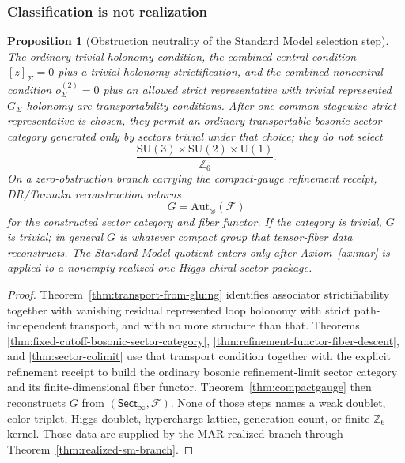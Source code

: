 \documentclass[11pt]{article}
\newtheorem{proposition}[theorem]{Proposition}
\newcommand{\SU}{\mathrm{SU}}
\newcommand{\U}{\mathrm{U}}
\begin{document}
\subsubsection{Classification is not realization}

\begin{proposition}[Obstruction neutrality of the Standard Model selection step]\label{prop:obstruction-neutrality}
The ordinary trivial-holonomy condition, the combined central condition
\([z]_\Sigma=0\) plus a trivial-holonomy strictification, and the combined noncentral condition
\(o^{(2)}_\Sigma=0\) plus an allowed strict representative with trivial represented
\(G_\Sigma\)-holonomy are transportability
conditions. After one common stagewise strict representative is chosen, they permit an
ordinary transportable bosonic sector category generated only by sectors trivial under that
choice; they do not select
\[
\frac{\SU(3)\times\SU(2)\times\U(1)}{\mathbb Z_6}.
\]
On a zero-obstruction branch carrying the compact-gauge refinement receipt, DR/Tannaka
reconstruction returns
\[
G=\mathrm{Aut}_\otimes(\mathcal F)
\]
for the constructed sector category and fiber functor. If the category is trivial, \(G\) is
trivial; in general \(G\) is whatever compact group that tensor-fiber data reconstructs. The
Standard Model quotient enters only after Axiom~\ref{ax:mar} is applied to a nonempty realized
one-Higgs chiral sector package.
\end{proposition}

\begin{proof}
Theorem~\ref{thm:transport-from-gluing} identifies associator strictifiability together with
vanishing residual represented loop holonomy with strict path-independent transport, and with no
more structure than that. Theorems
\ref{thm:fixed-cutoff-bosonic-sector-category}, \ref{thm:refinement-functor-fiber-descent}, and
\ref{thm:sector-colimit} use that transport condition together with the explicit refinement
receipt to build the ordinary bosonic refinement-limit sector category and its finite-dimensional
fiber functor. Theorem~\ref{thm:compactgauge} then
reconstructs \(G\) from \((\mathsf{Sect}_\infty,\mathcal F)\). None of those steps names a weak
doublet, color triplet, Higgs doublet, hypercharge lattice, generation count, or finite
\(\mathbb Z_6\) kernel. Those data are supplied by the MAR-realized branch through
Theorem~\ref{thm:realized-sm-branch}.
\end{proof}
\end{document}
